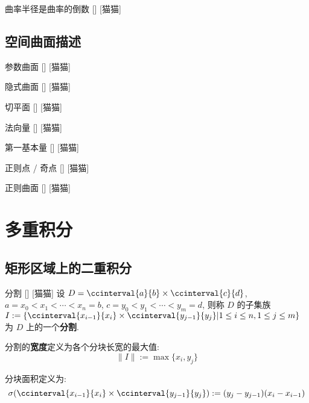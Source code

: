 \documentclass[UTF8]{ctexart}
\begin{document}
			\begin{ppt}
				[]
				{曲率半径是曲率的倒数}
				[]
				[猫猫]
			\end{ppt}

		\subsection{空间曲面描述}
			
			\begin{dfn}
				[]
				{参数曲面}
				[]
				[猫猫]
			\end{dfn}
			
			\begin{dfn}
				[]
				{隐式曲面}
				[]
				[猫猫]
			\end{dfn}
			
			\begin{dfn}
				[]
				{切平面}
				[]
				[猫猫]
			\end{dfn}
			
			\begin{dfn}
				[]
				{法向量}
				[]
				[猫猫]
			\end{dfn}
			
			\begin{dfn}
				[]
				{第一基本量}
				[]
				[猫猫]
			\end{dfn}
			
			\begin{dfn}
				[]
				{正则点 / 奇点}
				[]
				[猫猫]
			\end{dfn}
			
			\begin{dfn}
				[]
				{正则曲面}
				[]
				[猫猫]
			\end{dfn}
	
	\section{多重积分}
		
		\subsection{矩形区域上的二重积分}

			\begin{dfn}
			    []
			    {分割}
			    []
			    [猫猫]
				设 \(D=\ccinterval{a}{b}\times\ccinterval{c}{d}\), \(a=x_0<x_1<\cdots<x_n=b\), \(c=y_0<y_1<\cdots<y_m=d\), 则称 \(D\) 的子集族 \(I:=\{\ccinterval{x_{i-1}}{x_i}\times\ccinterval{y_{j-1}}{y_j}|1\leq i\leq n, 1\leq j\leq m\}\) 为 \(D\) 上的一个\textbf{分割}. 

				分割的\textbf{宽度}定义为各个分块长宽的最大值: 
				\[\|I\|:=\max\{x_i,y_j\}\]

				分块面积定义为: 
				\[\sigma(\ccinterval{x_{i-1}}{x_i}\times\ccinterval{y_{j-1}}{y_j}):=(y_j-y_{j-1})(x_i-x_{i-1})\]
			\end{dfn}
\end{document}
